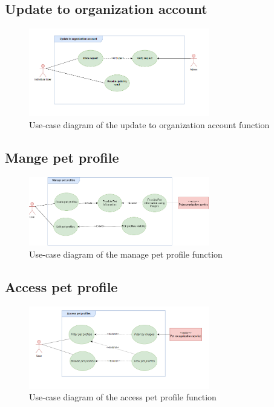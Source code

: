 

\subsection{Update to organization account}

\begin{figure}[H]
  \centering
  \includegraphics[width=0.7\textwidth]{Figures/update_org_ucd.png}
  \caption{Use-case diagram of the update to organization account function}
  \label{fig:update-org_activity_diagram}
\end{figure}



\subsection{Mange pet profile}

\begin {figure}[H]
\centering
\includegraphics[width=0.7\textwidth]{Figures/manage_pet_ucd.png}
\caption{Use-case diagram of the manage pet profile function}
\label{fig:manage-pet-activity-diagram}
\end{figure}



\subsection{Access pet profile}

\begin {figure}[H]
\centering
\includegraphics[width=0.7\textwidth]{Figures/access_pet_ucd.png}
\caption{Use-case diagram of the access pet profile function}
\label{fig:access-pet-activity-diagram}
\end{figure}

